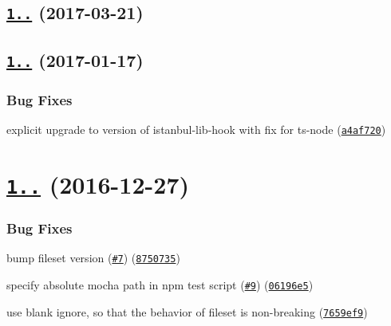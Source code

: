 \label{_1.1.3}%
 \subsection*{\href{https://github.com/istanbuljs/istanbul-api/compare/istanbul-api@1.1.1...istanbul-api@1.1.3}{\tt 1..} (2017-\/03-\/21)}

\label{_1.1.1}%
 \subsection*{\href{https://github.com/istanbuljs/istanbul-api/compare/v1.1.0...v1.1.1}{\tt 1..} (2017-\/01-\/17)}

\subsubsection*{Bug Fixes}


\begin{DoxyItemize}
\item explicit upgrade to version of istanbul-\/lib-\/hook with fix for ts-\/node (\href{https://github.com/istanbuljs/istanbul-api/commit/a4af720}{\tt a4af720})
\end{DoxyItemize}

\label{_1.1.0}%
 \section*{\href{https://github.com/istanbuljs/istanbul-api/compare/v1.1.0-alpha.1...v1.1.0}{\tt 1..} (2016-\/12-\/27)}

\subsubsection*{Bug Fixes}


\begin{DoxyItemize}
\item bump fileset version (\href{https://github.com/istanbuljs/istanbul-api/issues/7}{\tt \#7}) (\href{https://github.com/istanbuljs/istanbul-api/commit/8750735}{\tt 8750735})
\item specify absolute mocha path in npm test script (\href{https://github.com/istanbuljs/istanbul-api/issues/9}{\tt \#9}) (\href{https://github.com/istanbuljs/istanbul-api/commit/06196e5}{\tt 06196e5})
\item use blank ignore, so that the behavior of fileset is non-\/breaking (\href{https://github.com/istanbuljs/istanbul-api/commit/7659ef9}{\tt 7659ef9})
\end{DoxyItemize}

